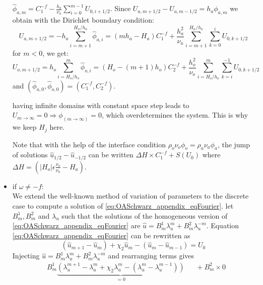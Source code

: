 \begin{appendix}
\begin{itemize}
		$\widehat{\phi}_{a,m}= {C}_1^{-f} - \frac{h_a}{\nu_a}
	\sum_{i=0}^{m-1} U_{0, i+1/2}$.
	Since $U_{a, m+1/2}- U_{a, m-1/2} =
	h_a \phi_{a, m}$ we obtain with the Dirichlet
	boundary condition:
	\begin{equation}
		U_{a,m+1/2} = -h_a\sum_{i=m+1}^{H_a/h_a}
		\widehat{\phi}_{a,i} =(m h_a - H_a){C}_1^{-f}+
		\frac{h_a^2}{\nu_a}\sum_{i=m+1}^{H_a/h_a}
		\sum_{k=0}^{i}U_{0,k+1/2}
	\end{equation}
	for $m<0$, we get:
	\begin{equation}
		U_{o,m+1/2} = h_o\sum_{i=H_o/h_o}^{m}
		\widehat{\phi}_{o,i} =(H_o - (m+1) h_o){C}_2^{-f}+
		\frac{h_o^2}{\nu_o}\sum_{i=H_o/h_o}^{m}
		\sum_{k=i}^{-1}U_{0,k+1/2}
	\end{equation}
	and $(\widehat{\phi}_{a,0}, \widehat{\phi}_{o,0}) =
		({C}_1^{-f},{C}_2^{-f})$.
	\begin{remark}
		having infinite domains with constant space step
		leads to $U_{m\rightarrow \infty}=0 \Rightarrow
		\phi_{(m\rightarrow \infty)}=0$, which overdetermines
		the system. This is why we keep $H_j$ here.
	\end{remark}
	Note that with the help of the interface condition
	$\rho_o \nu_o \phi_o = \rho_a \nu_a \phi_a$,
	the jump of solutions
	$\widehat{u}_{1/2} - \widehat{u}_{-1/2}$ can be written
		$ \Delta H \times {C}_1^{-f} +S(U_0)$ where
	$\Delta H = (|H_o|\epsilon \frac{\nu_o}{\nu_a} - H_a)$.
\item if $\omega \neq -f$: \\
We extend the well-known method of variation of parameters to the
discrete case to compute a solution of
\eqref{eq:OASchwarz_appendix_eqFourier}.
	let $B_m^1, B_m^2$ and $\lambda_u$ such that
	the solutions of the homogeneous version of
	\eqref{eq:OASchwarz_appendix_eqFourier} are
		$\widehat{u} = B^1_m \lambda_u^m +
			B^2_m \lambda_u^{-m}$.
	Equation \eqref{eq:OASchwarz_appendix_eqFourier}
	can be rewritten as
	\begin{equation}
		(\widehat{u}_{m+1} - \widehat{u}_{m})
		+\chi_2 \widehat{u}_{m}
		- (\widehat{u}_{m} - \widehat{u}_{m-1})
		= U_0
	\end{equation}
	Injecting $\widehat{u} = B^1_m \lambda_u^m +
	B^2_m \lambda_u^{-m}$ and rearranging terms gives
\begin{equation}
	\begin{aligned}
	&B^1_m \underbrace{\left(
		\lambda_u^{m+1} - \lambda_u^m + \chi_2 \lambda_u^m
		- (\lambda_u^{m} - \lambda_u^{m-1})
		\right)}_{=0} ~~~~~~~+ B^2_m \times 0 \\

\end{aligned}
\end{equation}
\end{itemize}
\end{appendix}
